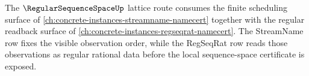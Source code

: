 The $\RegularSequenceSpaceUp$ lattice route consumes the finite scheduling surface of \autoref{ch:concrete-instances-streamname-namecert} together with the regular readback surface of \autoref{ch:concrete-instances-regseqrat-namecert}. The StreamName row fixes the visible observation order, while the RegSeqRat row reads those observations as regular rational data before the local sequence-space certificate is exposed.
